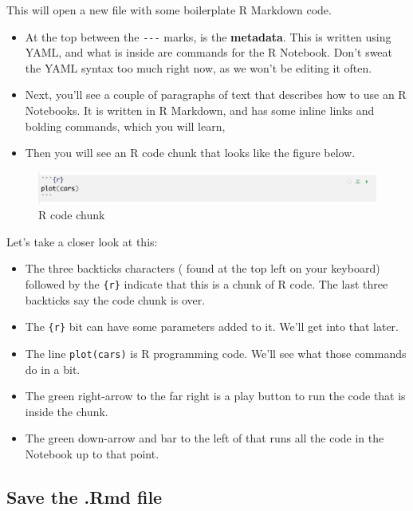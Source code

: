 \documentclass[]{book}
\providecommand{\tightlist}{%
  \setlength{\itemsep}{0pt}\setlength{\parskip}{0pt}}
\begin{document}
This will open a new file with some boilerplate R Markdown code.

\begin{itemize}
\tightlist
\item
  At the top between the \texttt{-\/-\/-} marks, is the
  \textbf{metadata}. This is written using YAML, and what is inside are
  commands for the R Notebook. Don't sweat the YAML syntax too much
  right now, as we won't be editing it often.
\item
  Next, you'll see a couple of paragraphs of text that describes how to
  use an R Notebooks. It is written in R Markdown, and has some inline
  links and bolding commands, which you will learn,
\item
  Then you will see an R code chunk that looks like the figure below.
\end{itemize}

\begin{figure}
\centering
\includegraphics[width=6.25000in]{_images/02-rstudio-rcodechunk.png}
\caption{R code chunk}
\end{figure}

Let's take a closer look at this:

\begin{itemize}
\tightlist
\item
  The three backticks characters ( found at the top left on your
  keyboard) followed by the \texttt{\{r\}} indicate that this is a chunk
  of R code. The last three backticks say the code chunk is over.
\item
  The \texttt{\{r\}} bit can have some parameters added to it. We'll get
  into that later.
\item
  The line \texttt{plot(cars)} is R programming code. We'll see what
  those commands do in a bit.
\item
  The green right-arrow to the far right is a play button to run the
  code that is inside the chunk.
\item
  The green down-arrow and bar to the left of that runs all the code in
  the Notebook up to that point.
\end{itemize}

\subsection{Save the .Rmd file}\label{save-the-.rmd-file}
\end{document}

